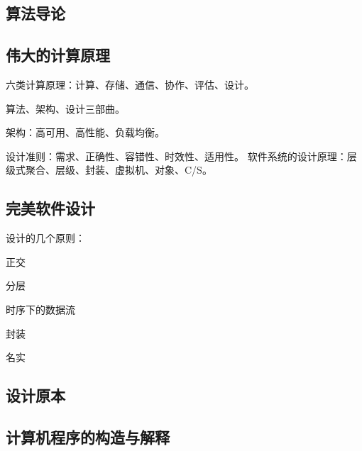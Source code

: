 \subsection{算法导论}

\subsection{伟大的计算原理}

六类计算原理：计算、存储、通信、协作、评估、设计。

算法、架构、设计三部曲。

架构：高可用、高性能、负载均衡。

设计准则：需求、正确性、容错性、时效性、适用性。
软件系统的设计原理：层级式聚合、层级、封装、虚拟机、对象、C/S。

\subsection{完美软件设计}

设计的几个原则：
\begin{enumbox}
\item 正交
\item 分层
\item 时序下的数据流
\item 封装
\item 名实
\end{enumbox}

\subsection{设计原本}

\subsection{计算机程序的构造与解释}
